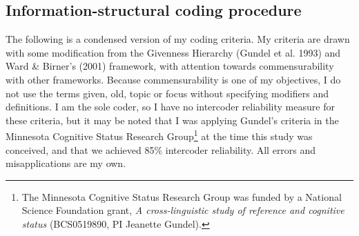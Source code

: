 \documentclass[output=paper]{LSP/langsci}
\begin{document}
\subsection{Information-structural coding procedure}\label{informationcoding}

The following is a condensed version of my coding criteria. My criteria are drawn with some modification from the Givenness Hierarchy (Gundel et al. 1993) and Ward \& Birner’s (2001) framework, with attention towards commensurability with other frameworks. Because commensurability is one of my objectives, I do not use the terms given, old, topic or focus without specifying modifiers and definitions. I am the sole coder, so I have no intercoder reliability measure for these criteria, but it may be noted that I was applying Gundel’s criteria in the Minnesota Cognitive Status Research Group\footnote{The Minnesota Cognitive Status Research Group was funded by a National Science Foundation grant, \textit{A cross-linguistic study of reference and cognitive status} (BCS0519890, PI Jeanette Gundel).} at the time this study was conceived, and that we achieved 85\% intercoder reliability. All errors and misapplications are my own.
\end{document}
